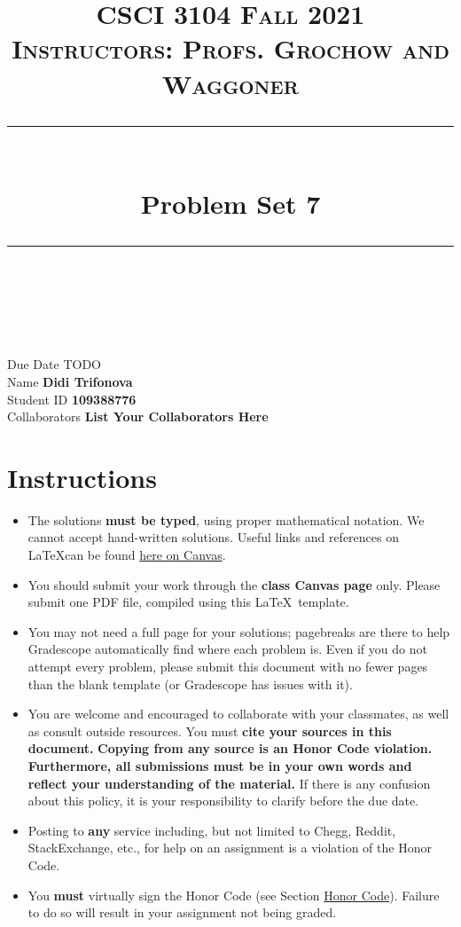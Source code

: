 \documentclass[11pt]{article}
\title{
\normalfont \normalsize 
\textsc{CSCI 3104 Fall 2021 \\ 
Instructors: Profs. Grochow and Waggoner} \\
[10pt] 
\rule{\linewidth}{0.5pt} \\[6pt] 
\huge Problem Set 7 \\
\rule{\linewidth}{2pt}  \\[10pt]
}
\date{}
\theoremstyle{definition}
\theoremstyle{definition}
\theoremstyle{definition}
\begin{document}
\maketitle


\noindent
Due Date \dotfill TODO \\
Name \dotfill \textbf{Didi Trifonova} \\
Student ID \dotfill \textbf{109388776} \\
Collaborators \dotfill \textbf{List Your Collaborators Here}

\tableofcontents

\section*{Instructions}
 \begin{itemize}
	\item The solutions \textbf{must be typed}, using proper mathematical notation. We cannot accept hand-written solutions. Useful links and references on \LaTeX can be found \href{https://canvas.colorado.edu/courses/75824/pages/latex}{here on Canvas}.
	\item You should submit your work through the \textbf{class Canvas page} only. Please submit one PDF file, compiled using this \LaTeX \ template.
	\item You may not need a full page for your solutions; pagebreaks are there to help Gradescope automatically find where each problem is. Even if you do not attempt every problem, please submit this document with no fewer pages than the blank template (or Gradescope has issues with it).

	\item You are welcome and encouraged to collaborate with your classmates, as well as consult outside resources. You must \textbf{cite your sources in this document.} \textbf{Copying from any source is an Honor Code violation. Furthermore, all submissions must be in your own words and reflect your understanding of the material.} If there is any confusion about this policy, it is your responsibility to clarify before the due date. 

	\item Posting to \textbf{any} service including, but not limited to Chegg, Reddit, StackExchange, etc., for help on an assignment is a violation of the Honor Code.

	\item You \textbf{must} virtually sign the Honor Code (see Section \hyperlink{HonorCode}{Honor Code}). Failure to do so will result in your assignment not being graded.
\end{itemize}
\end{document}

